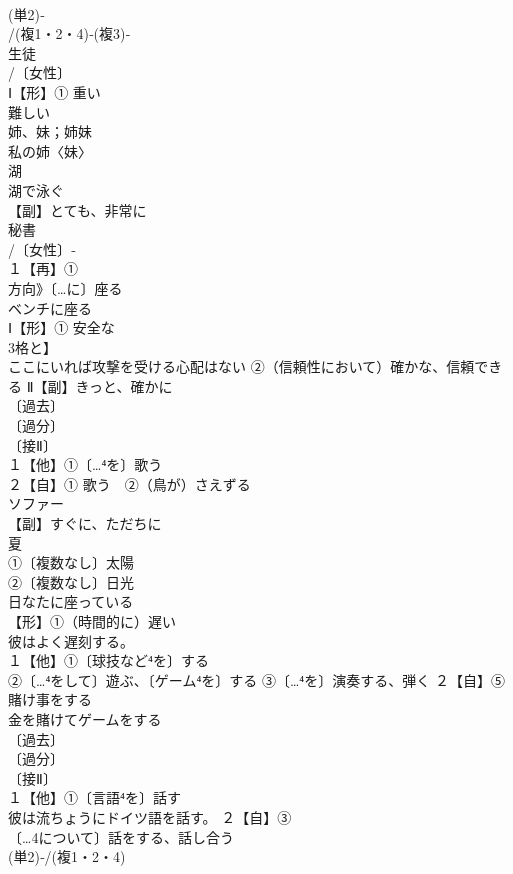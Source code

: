 \documentclass[8pt]{extreport}
\begin{document}
\begin{CJK}{UTF8}{min}
\\	(単2)‐
\\	/(複1・2・4)‐(複3)‐
\\	生徒
\\	/〔女性〕
\\	Ⅰ【形】① 重い
\\	難しい 
\\	姉、妹；姉妹
\\	私の姉〈妹〉 
\\	湖
\\	湖で泳ぐ
\\	【副】とても、非常に
\\	秘書
\\	/〔女性〕‐
\\	１【再】①
\\	方向》〔…に〕座る
\\	ベンチに座る
\\	Ⅰ【形】① 安全な
\\	3格と】
\\	ここにいれば攻撃を受ける心配はない ②（信頼性において）確かな、信頼できる Ⅱ【副】きっと、確かに
\\	〔過去〕
\\	〔過分〕
\\	〔接Ⅱ〕
\\	１【他】①〔…⁴を〕歌う 
\\	２【自】① 歌う　②（鳥が）さえずる
\\	ソファー
\\	【副】すぐに、ただちに
\\	夏 
\\	①〔複数なし〕太陽
\\	②〔複数なし〕日光 
\\	日なたに座っている
\\	【形】①（時間的に）遅い 
\\	彼はよく遅刻する。
\\	１【他】①〔球技など⁴を〕する
\\	②〔…⁴をして〕遊ぶ、〔ゲーム⁴を〕する ③〔…⁴を〕演奏する、弾く ２【自】⑤ 賭け事をする 
\\	金を賭けてゲームをする
\\	〔過去〕
\\	〔過分〕
\\	〔接Ⅱ〕
\\	１【他】①〔言語⁴を〕話す 
\\	彼は流ちょうにドイツ語を話す。 ２【自】③
\\	〔…4について〕話をする、話し合う
\\	(単2)‐/(複1・2・4)

\end{CJK}
\end{document}
